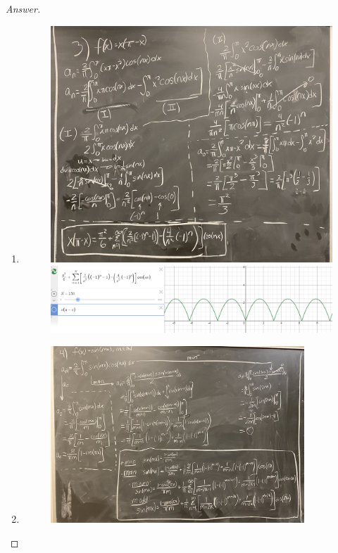 \documentclass{article}
\theoremstyle{definition}
\renewcommand\qedsymbol{$\blacksquare$}
\newenvironment{ans}{\begin{proof}[Answer]\renewcommand{\qedsymbol}{}}{\end{proof}}
\begin{document}
\begin{ans}
\begin{enumerate}
        \item \phantom{.} \begin{figure}[H]
            \centering
            \includegraphics[width = \textwidth]{Problem 5-3.jpg}
            \includegraphics[width = \textwidth]{Problem 5.3.png}
        \end{figure}
\newpage
        \item \phantom{.} \begin{figure}[H]
            \centering
            \includegraphics[width = 0.9\textwidth]{Problem 5-4.jpg}
        \end{figure}


\end{enumerate}
\end{ans}
\end{document}
